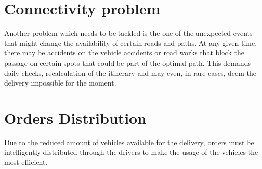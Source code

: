 \section{Connectivity problem}
Another problem which needs to be tackled is the one of the unexpected events that might change the availability of certain roads and paths. At any given time, there may be accidents on the vehicle accidents or road works that block the passage on certain spots that could be part of the optimal path. This demands daily checks, recalculation of the itinerary and may even, in rare cases, deem the delivery impossible for the moment.


\section{Orders Distribution}
Due to the reduced amount of vehicles available for the delivery, orders must be intelligently distributed through the drivers to make the usage of the vehicles the most efficient.
